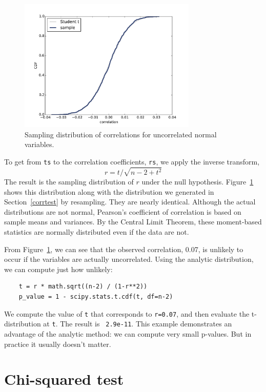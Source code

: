 \documentclass[12pt]{book}
\begin{document}
\begin{figure}
\centerline{\includegraphics[height=2.5in]{figs/normal4.pdf}}
\caption{Sampling distribution of correlations for uncorrelated
normal variables.}
\label{normal4}
\end{figure}

To get from {\tt ts} to the correlation coefficients, {\tt rs},
we apply the inverse transform,
%
\[ r = t / \sqrt{n - 2 + t^2} \]
%
The result is the sampling distribution of $r$ under the null hypothesis.
Figure~\ref{normal4} shows this distribution along with the distribution
we generated in Section~\ref{corrtest} by resampling.  They are nearly
identical.  Although the actual distributions are not normal, 
Pearson's coefficient of correlation is based on sample means
and variances.  By the Central Limit Theorem, these moment-based
statistics are normally distributed even if the data are not.

From Figure~\ref{normal4}, we can see that the
observed correlation, 0.07, is unlikely to occur if the variables
are actually uncorrelated.
Using the analytic distribution, we can compute just how unlikely:

\begin{verbatim}
    t = r * math.sqrt((n-2) / (1-r**2))
    p_value = 1 - scipy.stats.t.cdf(t, df=n-2)
\end{verbatim}

We compute the value of {\tt t} that corresponds to {\tt r=0.07}, and
then evaluate the t-distribution at {\tt t}.  The result is {\tt
  2.9e-11}.  This example demonstrates an advantage of the analytic
method: we can compute very small p-values.  But in practice it
usually doesn't matter.


\section{Chi-squared test}
\end{document}

